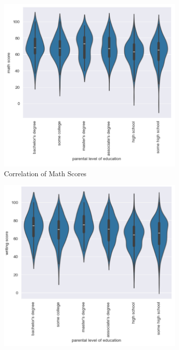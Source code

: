 \documentclass[man,floatsintext]{apa6} %
\begin{document}
\begin{figure}[H]
    \centering
    \caption{Correlations of Parent Education to Student Scores}
    \begin{subfigure}[b]{0.28\textwidth}
    \includegraphics[width=\linewidth]{MathVsParent.png}
    \caption{Correlation of Math Scores}
    \label{fig:math1}
    \end{subfigure}
    \begin{subfigure}[b]{0.28\textwidth}
    \includegraphics[width=\linewidth]{WritingVsParent.png}

\end{subfigure}
\end{figure}
\end{document}
